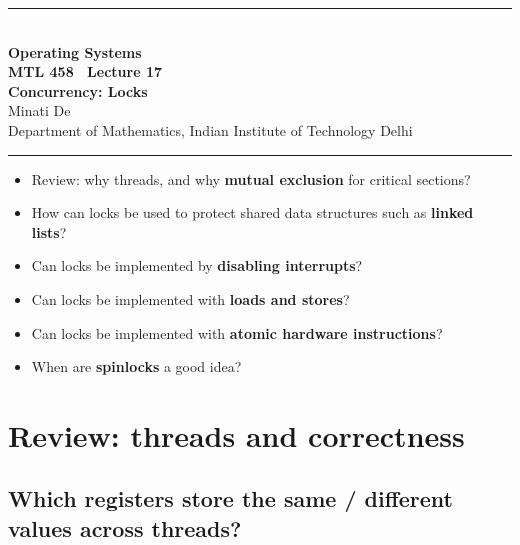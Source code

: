 \documentclass[11pt,a4paper]{article}
\begin{document}
\begin{center}
{\color{rulegray}\rule{\textwidth}{1.1pt}}\\[0.45em]
{\LARGE\bfseries Operating Systems}\\[0.25em]
{\Large\bfseries MTL 458 \textperiodcentered\ Lecture 17}\\[0.35em]
{\LARGE\bfseries Concurrency: Locks}\\[0.35em]
{\large Minati De}\\[0.15em]
{\normalsize Department of Mathematics, Indian Institute of Technology Delhi}\\[0.35em]
{\color{rulegray}\rule{\textwidth}{1.1pt}}
\end{center}

\vspace{0.4em}
\begin{keybox}
\begin{itemize}
  \item Review: why threads, and why \textbf{mutual exclusion} for critical
        sections?
  \item How can locks be used to protect shared data structures such as
        \textbf{linked lists}?
  \item Can locks be implemented by \textbf{disabling interrupts}?
  \item Can locks be implemented with \textbf{loads and stores}?
  \item Can locks be implemented with \textbf{atomic hardware instructions}?
  \item When are \textbf{spinlocks} a good idea?
\end{itemize}
\end{keybox}

\tableofcontents
\vspace{0.6em}
\noindent{\color{rulegray}\rule{\textwidth}{0.4pt}}

\section{Review: threads and correctness}

\subsection{Which registers store the same / different values across threads?}
\end{document}
